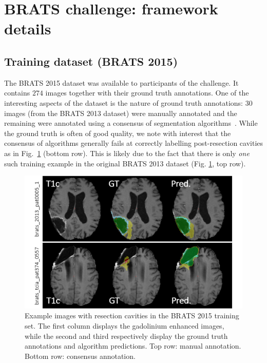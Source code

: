 
\section{BRATS challenge: framework details}

\subsection{Training dataset (BRATS 2015)}

The BRATS 2015 dataset was available to participants of the challenge. 
It contains $274$ images together with their ground truth annotations. 
One of the interesting aspects of the dataset is the nature of ground truth annotations: $30$ images 
(from the BRATS 2013 dataset) were manually annotated and the remaining were annotated using a consensus of 
segmentation algorithms~\cite{menze2015multimodal}. 
While the ground truth is often of good quality, we note with interest that the consensus of algorithms generally fails at correctly labelling post-resection cavities as in Fig.~\ref{fig:post-resection-cavities} (bottom row). This is likely due to the fact that there is only \textit{one} such training example in the original BRATS 2013 dataset (Fig. \ref{fig:post-resection-cavities}, top row). 

\begin{figure}
\centering
\includegraphics[width=1\textwidth]{images/BRATS2015_post-resection-cavities.png}
\caption{Example images with resection cavities in the BRATS 2015 training set. The first column displays the gadolinium enhanced images, while the second and third respectively display the ground truth annotations and algorithm predictions. Top row: manual annotation. Bottom row: consensus annotation.}
\label{fig:post-resection-cavities}
\end{figure}

